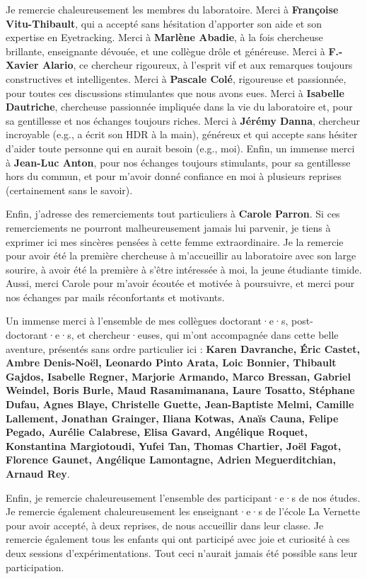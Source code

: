 \documentclass[
  a4paper,12pt,twoside,onecolumn,openright,final,oldfontcommands]{memoir}
\begin{document}
Je remercie chaleureusement les membres du laboratoire. Merci à \textbf{Françoise Vitu-Thibault}, qui a accepté sans hésitation d'apporter son aide et son expertise en Eyetracking. Merci à \textbf{Marlène Abadie}, à la fois chercheuse brillante, enseignante dévouée, et une collègue drôle et généreuse. Merci à \textbf{F.-Xavier Alario}, ce chercheur rigoureux, à l'esprit vif et aux remarques toujours constructives et intelligentes. Merci à \textbf{Pascale Colé}, rigoureuse et passionnée, pour toutes ces discussions stimulantes que nous avons eues. Merci à \textbf{Isabelle Dautriche}, chercheuse passionnée impliquée dans la vie du laboratoire et, pour sa gentillesse et nos échanges toujours riches. Merci à \textbf{Jérémy Danna}, chercheur incroyable (e.g., a écrit son HDR à la main), généreux et qui accepte sans hésiter d'aider toute personne qui en aurait besoin (e.g., moi). Enfin, un immense merci à \textbf{Jean-Luc Anton}, pour nos échanges toujours stimulants, pour sa gentillesse hors du commun, et pour m'avoir donné confiance en moi à plusieurs reprises (certainement sans le savoir).

Enfin, j'adresse des remerciements tout particuliers à \textbf{Carole Parron}. Si ces remerciements ne pourront malheureusement jamais lui parvenir, je tiens à exprimer ici mes sincères pensées à cette femme extraordinaire. Je la remercie pour avoir été la première chercheuse à m'accueillir au laboratoire avec son large sourire, à avoir été la première à s'être intéressée à moi, la jeune étudiante timide. Aussi, merci Carole pour m'avoir écoutée et motivée à poursuivre, et merci pour nos échanges par mails réconfortants et motivants.

Un immense merci à l'ensemble de mes collègues doctorant·e·s, post-doctorant·e·s, et chercheur·euses, qui m'ont accompagnée dans cette belle aventure, présentés sans ordre particulier ici : \textbf{Karen Davranche, Éric Castet, Ambre Denis-Noël, Leonardo Pinto Arata, Loic Bonnier, Thibault Gajdos, Isabelle Regner, Marjorie Armando, Marco Bressan, Gabriel Weindel, Boris Burle, Maud Rasamimanana, Laure Tosatto, Stéphane Dufau, Agnes Blaye, Christelle Guette, Jean-Baptiste Melmi, Camille Lallement, Jonathan Grainger, Iliana Kotwas, Anaïs Cauna, Felipe Pegado, Aurélie Calabrese, Elisa Gavard, Angélique Roquet, Konstantina Margiotoudi, Yufei Tan, Thomas Chartier, Joël Fagot, Florence Gaunet, Angélique Lamontagne, Adrien Meguerditchian, Arnaud Rey}.

Enfin, je remercie chaleureusement l'ensemble des participant·e·s de nos études. Je remercie également chaleureusement les enseignant·e·s de l'école La Vernette pour avoir accepté, à deux reprises, de nous accueillir dans leur classe. Je remercie également tous les enfants qui ont participé avec joie et curiosité à ces deux sessions d'expérimentations. Tout ceci n'aurait jamais été possible sans leur participation.
\end{document}
